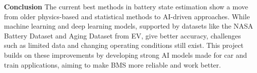 
\textbf{Conclusion}
The current best methods in battery state estimation show a move from older physics-based and statistical methods to AI-driven approaches. While machine learning and deep learning models, supported by datasets like the NASA Battery Dataset and Aging Dataset from EV, give better accuracy, challenges such as limited data and changing operating conditions still exist. This project builds on these improvements by developing strong AI models made for car and train applications, aiming to make BMS more reliable and work better.